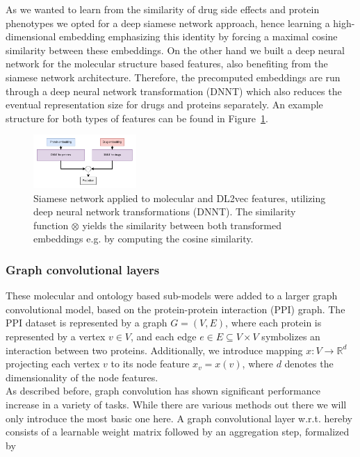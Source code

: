 \documentclass{bioinfo}
\begin{document}
As we wanted to learn from the similarity of drug side effects and protein phenotypes we opted for a deep siamese network approach, hence learning a high-dimensional embedding emphasizing this identity by forcing a maximal cosine similarity between these embeddings. On the other hand we built a deep neural network for the molecular structure based features, also benefiting from the siamese network architecture. Therefore, the precomputed embeddings are run through a deep neural network transformation (DNNT) which also reduces the eventual representation size for drugs and proteins separately. An example structure for both types of features can be found in Figure~\ref{fig:SiameseNetwork}.\\

\begin{figure}[!tpb]%
	\centerline{\includegraphics[width=0.35\textwidth]{figures/siamese_network.png}}
	\caption{Siamese network applied to molecular and DL2vec features, utilizing deep neural network transformations (DNNT). The similarity function $\otimes$ yields the similarity between both transformed embeddings e.g. by computing the cosine similarity.}\label{fig:SiameseNetwork}
\end{figure}


\subsubsection{Graph convolutional layers}
These molecular and ontology based sub-models were added to a larger graph convolutional model, based on the protein-protein interaction (PPI) graph. The PPI dataset is represented by a graph $G=(V,E)$, where each protein is represented by a vertex $v\in V$, and each edge $e\in E\subseteq V\times V$ symbolizes an interaction between two proteins. Additionally, we introduce mapping $x:V\rightarrow\mathbb{R}^{d}$ projecting each vertex $v$ to its node feature $x_v = x(v)$, where $d$ denotes the dimensionality of the node features. \\
 
As described before, graph convolution has shown significant performance increase in a variety of tasks. While there are various methods out there we will only introduce the most basic one here. A graph convolutional layer w.r.t. \citet{GCNConv} hereby consists of a learnable weight matrix followed by an aggregation step, formalized by
\end{document}
